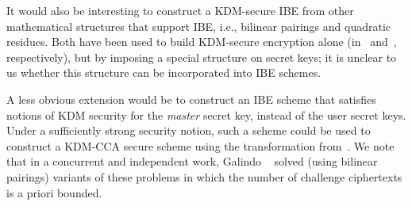 It would also be interesting to construct a KDM-secure IBE from other
mathematical structures that support IBE, i.e., bilinear pairings and
quadratic residues.  Both have been used to build KDM-secure
encryption alone (in~\cite{DBLP:conf/crypto/BonehHHO08}
and~\cite{DBLP:conf/crypto/BrakerskiG10}, respectively), but by
imposing a special structure on secret keys; it is unclear to us
whether this structure can be incorporated into IBE schemes.

A less obvious extension would be to construct an IBE scheme that
satisfies notions of KDM security for the \emph{master} secret key,
instead of the user secret keys.  Under a sufficiently strong security
notion, such a scheme could be used to construct a KDM-CCA secure
scheme using the transformation
from~\cite{DBLP:journals/siamcomp/BonehCHK07}.  We note that in a
concurrent and independent work, Galindo
\etal~\cite{cryptoeprint:2012:142} solved (using bilinear pairings)
variants of these problems in which the number of challenge
ciphertexts is a priori bounded.


